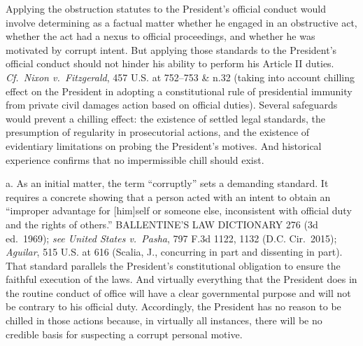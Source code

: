 Applying the obstruction statutes to the President's official conduct would involve determining as a factual matter whether he engaged in an obstructive act, whether the act had a nexus to official proceedings, and whether he was motivated by corrupt intent.
But applying those standards to the President's official conduct should not hinder his ability to perform his Article II duties.
\textit{Cf.~Nixon v.\ Fitzgerald}, 457 U.S. at 752--753 \& n.32 (taking into account chilling effect on the President in adopting a constitutional rule of presidential immunity from private civil damages action based on official duties).
Several safeguards would prevent a chilling effect: the existence of settled legal standards, the presumption of regularity in prosecutorial actions, and the existence of evidentiary limitations on probing the President's motives.
And historical experience confirms that no impermissible chill should exist.

a. As an initial matter, the term ``corruptly'' sets a demanding standard.
It requires a concrete showing that a person acted with an intent to obtain an ``improper advantage for [him]self or someone else, inconsistent with official duty and the rights of others.'' BALLENTINE'S LAW DICTIONARY 276 (3d ed.~1969);
\textit{see United States v.\ Pasha}, 797 F.3d 1122, 1132 (D.C. Cir.~2015);
\textit{Aguilar}, 515 U.S. at 616 (Scalia, J., concurring in part and dissenting in part).
That standard parallels the President's constitutional obligation to ensure the faithful execution of the laws.
And virtually everything that the President does in the routine conduct of office will have a clear governmental purpose and will not be contrary to his official duty.
Accordingly, the President has no reason to be chilled in those actions because, in virtually all instances, there will be no credible basis for suspecting a corrupt personal motive.

